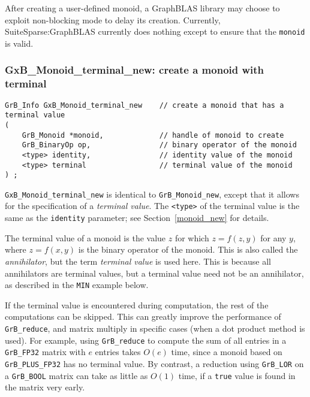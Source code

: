 \documentclass[12pt]{article}
\begin{document}
After creating a user-defined monoid, a GraphBLAS library may choose to exploit
non-blocking mode to delay its creation.  Currently, SuiteSparse:GraphBLAS
currently does nothing except to ensure that the \verb'monoid' is valid.

\newpage
\subsubsection{{\sf GxB\_Monoid\_terminal\_new:} create a monoid with terminal}
\label{monoid_terminal_new}

\begin{mdframed}[userdefinedwidth=6in]
{\footnotesize
\begin{verbatim}
GrB_Info GxB_Monoid_terminal_new    // create a monoid that has a terminal value
(
    GrB_Monoid *monoid,             // handle of monoid to create
    GrB_BinaryOp op,                // binary operator of the monoid
    <type> identity,                // identity value of the monoid
    <type> terminal                 // terminal value of the monoid
) ;
\end{verbatim}
} \end{mdframed}

\verb'GxB_Monoid_terminal_new' is identical to \verb'GrB_Monoid_new', except
that it allows for the specification of a {\em terminal value}.  The
\verb'<type>' of the terminal value is the same as the \verb'identity'
parameter; see Section~\ref{monoid_new} for details.

The terminal value of a monoid is the value $z$ for which $z=f(z,y)$ for any
$y$, where $z=f(x,y)$ is the binary operator of the monoid.  This is also
called the {\em annihilator}, but the term {\em terminal value} is used here.
This is because all annihilators are terminal values, but a terminal value need
not be an annihilator, as described in the \verb'MIN' example below.

If the terminal value is encountered during computation, the rest of the
computations can be skipped.  This can greatly improve the performance of
\verb'GrB_reduce', and matrix multiply in specific cases (when a dot product
method is used).  For example, using \verb'GrB_reduce' to compute the sum of
all entries in a \verb'GrB_FP32' matrix with $e$ entries takes $O(e)$ time,
since a monoid based on \verb'GrB_PLUS_FP32' has no terminal value.  By
contrast, a reduction using \verb'GrB_LOR' on a \verb'GrB_BOOL' matrix can take
as little as $O(1)$ time, if a \verb'true' value is found in the matrix very
early.
\end{document}
